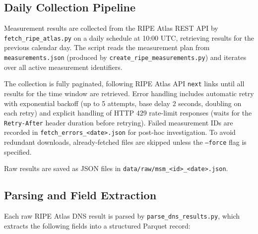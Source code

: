 \subsection{Daily Collection Pipeline}
\label{subsec:3.4.1}

Measurement results are collected from the RIPE Atlas REST API by \texttt{fetch\_ripe\_atlas.py} on a daily schedule at 10:00 UTC, retrieving results for the previous calendar day. The script reads the measurement plan from \texttt{measurements.json} (produced by \texttt{create\_ripe\_measurements.py}) and iterates over all active measurement identifiers.

The collection is fully paginated, following RIPE Atlas API \texttt{next} links until all results for the time window are retrieved. Error handling includes automatic retry with exponential backoff (up to 5 attempts, base delay 2 seconds, doubling on each retry) and explicit handling of \ac{HTTP} 429 rate-limit responses (waits for the \texttt{Retry-After} header duration before retrying). Failed measurement IDs are recorded in \texttt{fetch\_errors\_<date>.json} for post-hoc investigation. To avoid redundant downloads, already-fetched files are skipped unless the \texttt{--force} flag is specified.

Raw results are saved as JSON files in \texttt{data/raw/msm\_<id>\_<date>.json}.

\subsection{Parsing and Field Extraction}
\label{subsec:3.4.2}

Each raw RIPE Atlas \ac{DNS} result is parsed by \texttt{parse\_dns\_results.py}, which extracts the following fields into a structured Parquet record:

